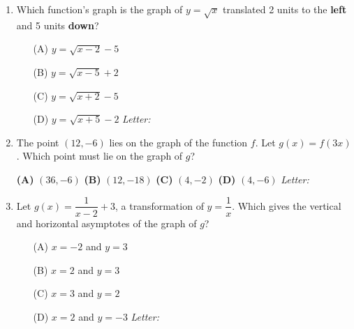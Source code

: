 \documentclass[10pt]{article}
\begin{document}
\begin{enumerate}[leftmargin=1.9em, itemsep=12pt]

\item Which function's graph is the graph of $y = \sqrt{x}$ translated 2 units to the
      \textbf{left} and 5 units \textbf{down}?

      \begin{enumerate}[leftmargin=2.6em, itemsep=2pt]
        \item[(A)] $y = \sqrt{x - 2} - 5$
        \item[(B)] $y = \sqrt{x - 5} + 2$
        \item[(C)] $y = \sqrt{x + 2} - 5$
        \item[(D)] $y = \sqrt{x + 5} - 2$ \hfill\textit{Letter:}~\gradedblank[id=ap1, type=choice, points=1, answer=C]{0.42in}{13pt}
      \end{enumerate}

\item The point $(12, -6)$ lies on the graph of the function $f$. Let $g(x) = f(3x)$. Which
      point must lie on the graph of $g$?

      \smallskip
      \textbf{(A)} $(36, -6)$ \hspace{2.2em} \textbf{(B)} $(12, -18)$ \hspace{2.2em} \textbf{(C)} $(4, -2)$ \hspace{2.2em} \textbf{(D)} $(4, -6)$ \hfill\textit{Letter:}~\gradedblank[id=ap2, type=choice, points=1, answer=D]{0.42in}{13pt}

\item Let $g(x) = \dfrac{1}{x - 2} + 3$, a transformation of $y = \dfrac{1}{x}$. Which gives the
      vertical and horizontal asymptotes of the graph of $g$?
      \begin{enumerate}[leftmargin=2.6em, itemsep=2pt]
        \item[(A)] $x = -2$ and $y = 3$
        \item[(B)] $x = 2$ and $y = 3$
        \item[(C)] $x = 3$ and $y = 2$
        \item[(D)] $x = 2$ and $y = -3$ \hfill\textit{Letter:}~\gradedblank[id=ap3, type=choice, points=1, answer=B]{0.42in}{13pt}
      \end{enumerate}


\end{enumerate}
\end{document}
